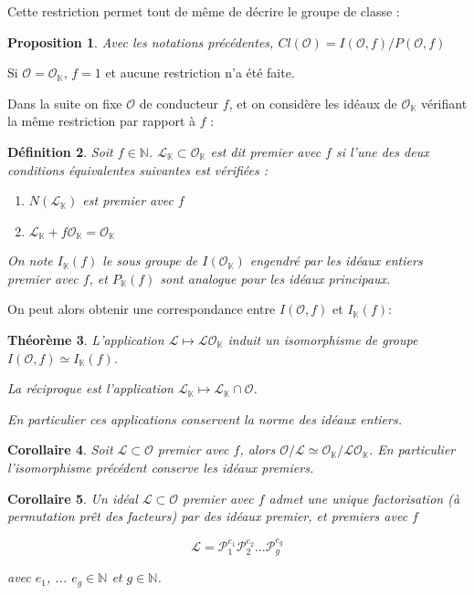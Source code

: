 \documentclass{article}
\newcommand{\N}[0]{\mathbb{N}}
\newcommand{\K}[0]{\mathbb{K}}
\newcommand{\OR}[0]{\mathcal{O}}
\newcommand{\LR}[0]{\mathcal{L}}
\newcommand{\PR}[0]{\mathcal{P}}
\newtheorem{The}{Théorème}[section]
\newtheorem{Prop}[The]{Proposition}
\newtheorem{Def}[The]{Définition}
\newtheorem{Coro}[The]{Corollaire}
\begin{document}
Cette restriction permet tout de même de décrire le groupe de classe :

\begin{Prop}
	Avec les notations précédentes, $Cl(\OR) =  I(\OR, f)/P(\OR, f)$
\end{Prop}

Si $\OR = \OR_{\K}$, $f = 1$ et aucune restriction n'a été faite. 

Dans la suite on fixe $\OR$ de conducteur $f$, et on considère les idéaux de $\OR_{\K}$ vérifiant la même restriction par rapport à $f$ :

\begin{Def}
	Soit $f\in\N$. $\LR_{\K}\subset\OR_{\K}$ est dit premier avec $f$ si l'une des deux conditions équivalentes suivantes est vérifiées :
	
	\begin{enumerate}
		\item $N(\LR_{\K})$ est premier avec $f$
		\item $\LR_{\K} + f\OR_{\K} = \OR_{\K}$
	\end{enumerate}
	
	On note $I_{\K}(f)$ le sous groupe de $I(\OR_{\K})$ engendré par les idéaux entiers premier avec $f$, et $P_{\K}(f)$ sont analogue pour les idéaux principaux. 
\end{Def}

On peut alors obtenir une correspondance entre $I(\OR, f)$ et $I_{\K}(f)$:

\begin{The}
	L'application $\LR\mapsto\LR\OR_{\K}$ induit un isomorphisme de groupe $I(\OR, f)\simeq I_{\K}(f)$.
	
	La réciproque est l'application $\LR_{\K}\mapsto\LR_{\K}\cap\OR$.
	
	En particulier ces applications conservent la norme des idéaux entiers. 
\end{The}

\begin{Coro}
	Soit $\LR\subset\OR$ premier avec $f$, alors $\OR/\LR \simeq \OR_{\K}/\LR\OR_{\K}$. En particulier l'isomorphisme précédent conserve les idéaux premiers. 
\end{Coro}

\begin{Coro}
	Un idéal $\LR\subset\OR$ premier avec $f$ admet une unique factorisation (à permutation prêt des facteurs) par des idéaux premier, et premiers avec $f$
	
	\begin{equation*}
		\LR = \PR_{1}^{e_{1}}\PR_{2}^{e_{2}}\ldots\PR_{g}^{e_{g}}
	\end{equation*}
	
	avec $e_{1}$, ... $e_{g}\in\N$ et $g\in\N$.
	
\end{Coro}
\end{document}
